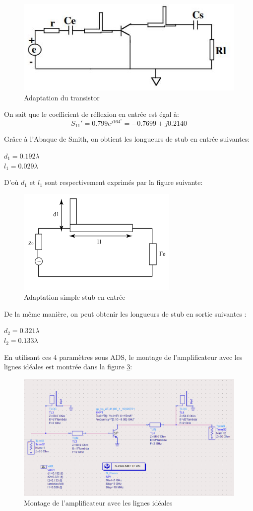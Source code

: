 \documentclass[french]{article}
\begin{document}
\begin{figure}[H]
	\centering
	\includegraphics[width=0.6\linewidth]{../5SynthAmp/adaptation_e_s}
	\caption{Adaptation du transistor}
	\label{fig:adaptation_e_s}
\end{figure}

On sait que le coefficient de réflexion en entrée est égal à:
\begin{equation}
	S_{11}'=0.799e^{j164^{\circ}}=-0.7699+j0.2140
\end{equation}

Grâce à l’Abaque de Smith, on obtient les longueurs de stub en entrée suivantes:

{\centering
	$d_{1}=0.192\lambda$\\
	$l_{1}=0.029\lambda$\\
}
	
D’où $d_{1}$ et $l_{1}$ sont respectivement exprimés par la figure suivante:
\begin{figure}[H]
	\centering
	\includegraphics[width=0.55\linewidth]{../5SynthAmp/simple_stub_e}
	\caption{Adaptation simple stub en entrée}
	\label{fig:simple_stub_e}
\end{figure}

De la même manière, on peut obtenir les longueurs de stub en sortie suivantes :
 
{\centering
	$d_{2}=0.321\lambda$\\
	$l_{2}=0.133\lambda$\\
}

En utilisant ces 4 paramètres sous ADS, le montage de l’amplificateur avec les lignes idéales est montrée dans la figure \ref{fig:ligne_ideal}:
\begin{figure}[H]
	\centering
	\includegraphics[width=0.7\linewidth]{../5SynthAmp/ligne_ideal}
	\caption{Montage de l’amplificateur avec les lignes idéales}
	\label{fig:ligne_ideal}
\end{figure}
\end{document}
